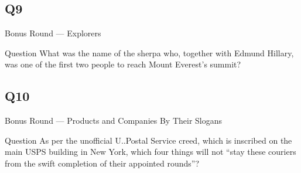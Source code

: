 \documentclass[11pt]{beamer}
\begin{document}
\subsection*{Q9}
\begin{frame}[t]{Bonus Round --- Explorers}
\begin{block}{Question}
What was the name of the sherpa who, together with Edmund Hillary, was one of the first two people to reach Mount Everest's summit?
\end{block}
\end{frame}
\subsection*{Q10}
\begin{frame}[t]{Bonus Round --- Products and Companies By Their Slogans}
\begin{block}{Question}
As per the unofficial U.\@S.\@ Postal Service creed, which is inscribed on the main USPS building in New York, which four things will not ``stay these couriers from the swift completion of their appointed rounds''?
\end{block}
\end{frame}
\end{document}
